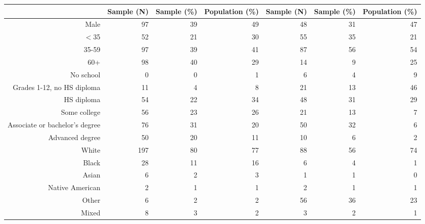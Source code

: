 \begin{table}[ht]
\centering
\begin{tabular}{rrrrrrr}
  \hline
 & Sample (N) & Sample (\%) & Population (\%) & Sample (N) & Sample (\%) & Population (\%) \\ 
  \hline
Male & 97 & 39 & 49 & 48 & 31 & 47 \\ 
  $<$35 & 52 & 21 & 30 & 55 & 35 & 21 \\ 
  35-59 & 97 & 39 & 41 & 87 & 56 & 54 \\ 
  60+ & 98 & 40 & 29 & 14 & 9 & 25 \\ 
  No school & 0 & 0 & 1 & 6 & 4 & 9 \\ 
  Grades 1-12, no HS diploma & 11 & 4 & 8 & 21 & 13 & 46 \\ 
  HS diploma & 54 & 22 & 34 & 48 & 31 & 29 \\ 
  Some college & 56 & 23 & 26 & 21 & 13 & 7 \\ 
  Associate or bachelor's degree & 76 & 31 & 20 & 50 & 32 & 6 \\ 
  Advanced degree & 50 & 20 & 11 & 10 & 6 & 2 \\ 
  White & 197 & 80 & 77 & 88 & 56 & 74 \\ 
  Black & 28 & 11 & 16 & 6 & 4 & 1 \\ 
  Asian & 6 & 2 & 3 & 1 & 1 & 0 \\ 
  Native American & 2 & 1 & 1 & 2 & 1 & 1 \\ 
  Other & 6 & 2 & 2 & 56 & 36 & 23 \\ 
  Mixed & 8 & 3 & 2 & 3 & 2 & 1 \\ 
   \hline
\end{tabular}
\end{table}
